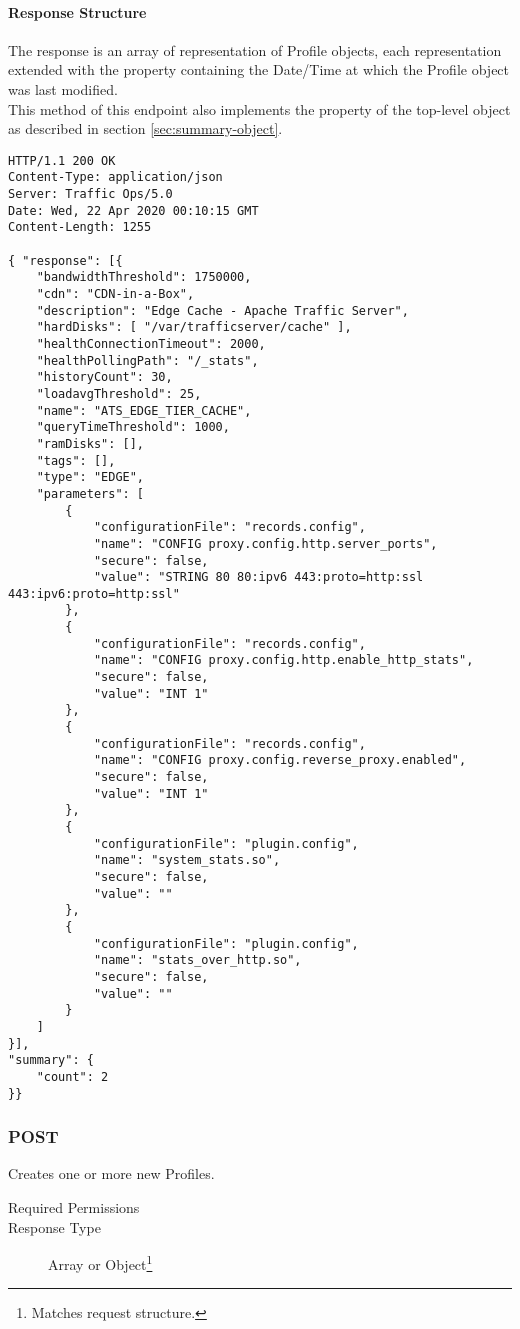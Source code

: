 \paragraph{Response Structure}
The response is an array of representation of Profile objects, each
representation extended with the  property containing the
Date/Time at which the Profile object was last modified.\\
This method of this endpoint also implements the  property of the
top-level  object as described in section
\ref{sec:summary-object}.

\begin{codelisting}
\begin{verbatim}
HTTP/1.1 200 OK
Content-Type: application/json
Server: Traffic Ops/5.0
Date: Wed, 22 Apr 2020 00:10:15 GMT
Content-Length: 1255

{ "response": [{
	"bandwidthThreshold": 1750000,
	"cdn": "CDN-in-a-Box",
	"description": "Edge Cache - Apache Traffic Server",
	"hardDisks": [ "/var/trafficserver/cache" ],
	"healthConnectionTimeout": 2000,
	"healthPollingPath": "/_stats",
	"historyCount": 30,
	"loadavgThreshold": 25,
	"name": "ATS_EDGE_TIER_CACHE",
	"queryTimeThreshold": 1000,
	"ramDisks": [],
	"tags": [],
	"type": "EDGE",
	"parameters": [
		{
			"configurationFile": "records.config",
			"name": "CONFIG proxy.config.http.server_ports",
			"secure": false,
			"value": "STRING 80 80:ipv6 443:proto=http:ssl 443:ipv6:proto=http:ssl"
		},
		{
			"configurationFile": "records.config",
			"name": "CONFIG proxy.config.http.enable_http_stats",
			"secure": false,
			"value": "INT 1"
		},
		{
			"configurationFile": "records.config",
			"name": "CONFIG proxy.config.reverse_proxy.enabled",
			"secure": false,
			"value": "INT 1"
		},
		{
			"configurationFile": "plugin.config",
			"name": "system_stats.so",
			"secure": false,
			"value": ""
		},
		{
			"configurationFile": "plugin.config",
			"name": "stats_over_http.so",
			"secure": false,
			"value": ""
		}
	]
}],
"summary": {
	"count": 2
}}
\end{verbatim}
\end{codelisting}

\subsubsection{POST}
Creates one or more new Profiles.
\begin{description}
	\item[Required Permissions] 
	\item[Response Type] Array or Object\footnote{Matches request structure.}
\end{description}

